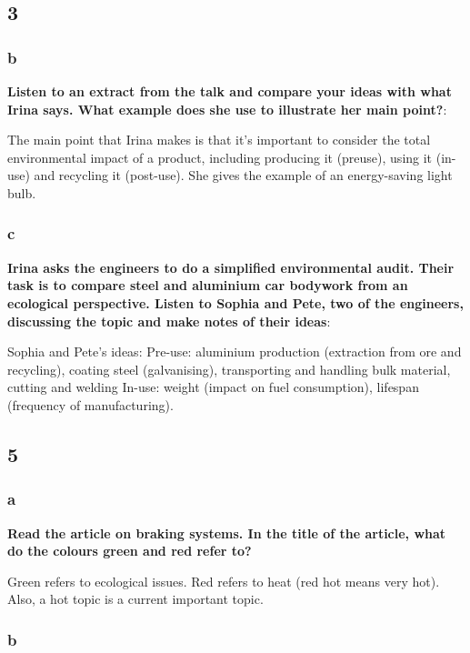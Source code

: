 \subsection{3}

\subsubsection{b}

\textbf{Listen to an extract from the talk and compare your ideas with what Irina says. What example does she use to illustrate her main point?}:

The main point that Irina makes is that it's important to consider the total environmental impact of a product, including producing it (preuse), using it (in-use) and recycling it (post-use). She gives the example of an energy-saving light bulb.

\subsubsection{c}

\textbf{Irina asks the engineers to do a simplified environmental audit. Their task is to compare steel and aluminium car bodywork from an ecological perspective. Listen to Sophia and Pete, two of the engineers, discussing the topic and make notes of their ideas}:

Sophia and Pete's ideas: Pre-use: aluminium production (extraction from ore and recycling), coating steel (galvanising), transporting and handling bulk material, cutting and welding In-use: weight (impact on fuel consumption), lifespan (frequency of manufacturing).

\subsection{5}

\subsubsection{a}

\textbf{Read the article on braking systems. In the title of the article, what do the colours green and red refer to?}

Green refers to ecological issues. Red refers to heat (red hot means very hot). Also, a hot topic is a current important topic.

\subsubsection{b}


